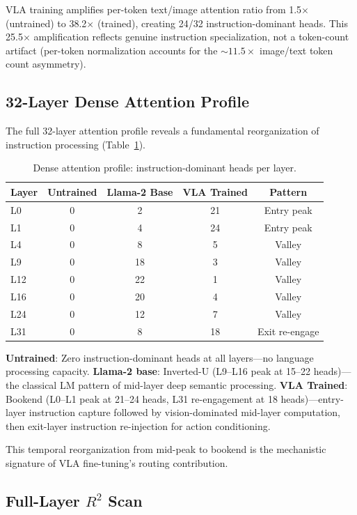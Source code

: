 \documentclass[10pt,twocolumn]{article}
\begin{document}
VLA training amplifies per-token text/image attention ratio from 1.5$\times$ (untrained) to 38.2$\times$ (trained), creating 24/32 instruction-dominant heads.
This 25.5$\times$ amplification reflects genuine instruction specialization, not a token-count artifact (per-token normalization accounts for the ${\sim}11.5\times$ image/text token count asymmetry).

\subsection{32-Layer Dense Attention Profile}
\label{sec:dense}

The full 32-layer attention profile reveals a fundamental reorganization of instruction processing (Table~\ref{tab:dense}).

\begin{table}[t]
\centering
\caption{Dense attention profile: instruction-dominant heads per layer.}
\label{tab:dense}
\small
\begin{tabular}{lcccc}
\toprule
Layer & Untrained & Llama-2 Base & VLA Trained & Pattern \\
\midrule
L0 & 0 & 2 & 21 & Entry peak \\
L1 & 0 & 4 & 24 & Entry peak \\
L4 & 0 & 8 & 5 & Valley \\
L9 & 0 & 18 & 3 & Valley \\
L12 & 0 & 22 & 1 & Valley \\
L16 & 0 & 20 & 4 & Valley \\
L24 & 0 & 12 & 7 & Valley \\
L31 & 0 & 8 & 18 & Exit re-engage \\
\bottomrule
\end{tabular}
\end{table}

\textbf{Untrained}: Zero instruction-dominant heads at all layers---no language processing capacity.
\textbf{Llama-2 base}: Inverted-U (L9--L16 peak at 15--22 heads)---the classical LM pattern of mid-layer deep semantic processing.
\textbf{VLA Trained}: Bookend (L0--L1 peak at 21--24 heads, L31 re-engagement at 18 heads)---entry-layer instruction capture followed by vision-dominated mid-layer computation, then exit-layer instruction re-injection for action conditioning.

This temporal reorganization from mid-peak to bookend is the mechanistic signature of VLA fine-tuning's routing contribution.

\subsection{Full-Layer $R^2$ Scan}
\label{sec:r2}
\end{document}
